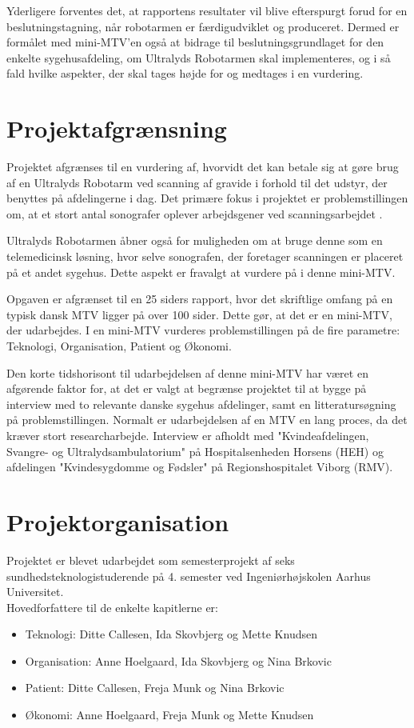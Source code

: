 Yderligere forventes det, at rapportens resultater vil blive efterspurgt forud for en beslutningstagning, når robotarmen er færdigudviklet og produceret. Dermed er formålet med mini-MTV’en også at bidrage til beslutningsgrundlaget for den enkelte sygehusafdeling, om Ultralyds Robotarmen skal implementeres, og i så fald hvilke aspekter, der skal tages højde for og medtages i en vurdering.

\section{Projektafgrænsning}
Projektet afgrænses til en vurdering af, hvorvidt det kan betale sig at gøre brug af en Ultralyds Robotarm ved scanning af gravide i forhold til det udstyr, der benyttes på afdelingerne i dag. Det primære fokus i projektet er problemstillingen om, at et stort antal sonografer oplever arbejdsgener ved scanningsarbejdet \cite{31}\cite{30}\citep{24}\cite{36}. 

Ultralyds Robotarmen åbner også for muligheden om at bruge denne som en telemedicinsk løsning, hvor selve sonografen, der foretager scanningen er placeret på et andet sygehus. Dette aspekt er fravalgt at vurdere på i denne mini-MTV. 

Opgaven er afgrænset til en 25 siders rapport, hvor det skriftlige omfang på en typisk dansk MTV ligger på over 100 sider. Dette gør, at det er en mini-MTV, der udarbejdes. I en mini-MTV vurderes problemstillingen på de fire parametre: Teknologi, Organisation, Patient og Økonomi. 

Den korte tidshorisont til udarbejdelsen af denne mini-MTV har været en afgørende faktor for, at det er valgt at begrænse projektet til at bygge på interview med to relevante danske sygehus afdelinger, samt en litteratursøgning på problemstillingen. Normalt er udarbejdelsen af en MTV en lang proces, da det kræver stort researcharbejde. Interview er afholdt med "Kvindeafdelingen, Svangre- og Ultralydsambulatorium" på Hospitalsenheden Horsens (HEH) og afdelingen "Kvindesygdomme og Fødsler" på Regionshospitalet Viborg (RMV).

\section{Projektorganisation}
Projektet er blevet udarbejdet som semesterprojekt af seks sundhedsteknologistuderende på 4. semester ved Ingeniørhøjskolen Aarhus Universitet. \\
Hovedforfattere til de enkelte kapitlerne er:
\begin{itemize}
\item Teknologi: Ditte Callesen, Ida Skovbjerg og  Mette Knudsen
\item Organisation: Anne Hoelgaard, Ida Skovbjerg og Nina Brkovic
\item Patient: Ditte Callesen, Freja Munk og Nina Brkovic
\item Økonomi: Anne Hoelgaard, Freja Munk og Mette Knudsen
\end{itemize}

\label{version_Systemark}
